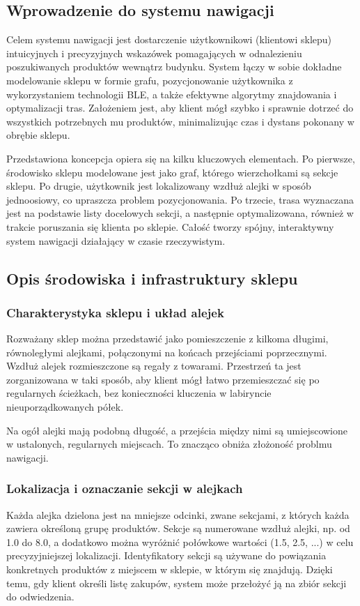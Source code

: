 \subsection{Wprowadzenie do systemu nawigacji}
Celem systemu nawigacji jest dostarczenie użytkownikowi (klientowi sklepu) intuicyjnych i precyzyjnych wskazówek pomagających w odnalezieniu poszukiwanych produktów wewnątrz budynku. System łączy w sobie dokładne modelowanie sklepu w formie grafu, pozycjonowanie użytkownika z wykorzystaniem technologii BLE, a także efektywne algorytmy znajdowania i optymalizacji tras. Założeniem jest, aby klient mógł szybko i sprawnie dotrzeć do wszystkich potrzebnych mu produktów, minimalizując czas i dystans pokonany w obrębie sklepu.

Przedstawiona koncepcja opiera się na kilku kluczowych elementach. Po pierwsze, środowisko sklepu modelowane jest jako graf, którego wierzchołkami są sekcje sklepu. Po drugie, użytkownik jest lokalizowany wzdłuż alejki w sposób jednoosiowy, co upraszcza problem pozycjonowania. Po trzecie, trasa wyznaczana jest na podstawie listy docelowych sekcji, a następnie optymalizowana, również w trakcie poruszania się klienta po sklepie. Całość tworzy spójny, interaktywny system nawigacji działający w czasie rzeczywistym.

\subsection{Opis środowiska i infrastruktury sklepu}

\subsubsection{Charakterystyka sklepu i układ alejek}
Rozważany sklep można przedstawić jako pomieszczenie z kilkoma długimi, równoległymi alejkami, połączonymi na końcach przejściami poprzecznymi. Wzdłuż alejek rozmieszczone są regały z towarami. Przestrzeń ta jest zorganizowana w taki sposób, aby klient mógł łatwo przemieszczać się po regularnych ścieżkach, bez konieczności kluczenia w labiryncie nieuporządkowanych półek.

Na ogół alejki mają podobną długość, a przejścia między nimi są umiejscowione w ustalonych, regularnych miejscach. To znacząco obniża złożoność problmu nawigacji.
\subsubsection{Lokalizacja i oznaczanie sekcji w alejkach}
Każda alejka dzielona jest na mniejsze odcinki, zwane sekcjami, z których każda zawiera określoną grupę produktów. Sekcje są numerowane wzdłuż alejki, np. od 1.0 do 8.0, a dodatkowo można wyróżnić połówkowe wartości (1.5, 2.5, ...) w celu precyzyjniejszej lokalizacji. Identyfikatory sekcji są używane do powiązania konkretnych produktów z miejscem w sklepie, w którym się znajdują. Dzięki temu, gdy klient określi listę zakupów, system może przełożyć ją na zbiór sekcji do odwiedzenia.

